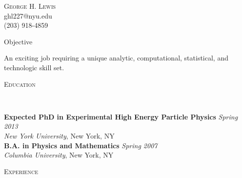 \documentclass[9pt]{article}
\newenvironment{changemargin}[2]{%
  \begin{list}{}{%
    \setlength{\topsep}{0pt}%
    \setlength{\leftmargin}{#1}%
    \setlength{\rightmargin}{#2}%
    \setlength{\listparindent}{\parindent}%
    \setlength{\itemindent}{\parindent}%
    \setlength{\parsep}{\parskip}%
  }%
  \item[]}{\end{list}
}
\newcommand{\lineover}{
	\begin{changemargin}{-0.05in}{-0.05in}
		\vspace*{-8pt}
		\hrulefill \\
		\vspace*{-2pt}
	\end{changemargin}
}
\newcommand{\header}[1]{
	\begin{changemargin}{-0.5in}{-0.5in}
		\scshape{#1}\\
  	\lineover
	\end{changemargin}
}
\newcommand{\contact}[4]{
	\begin{changemargin}{-0.5in}{-0.5in}
		\begin{center}
			{\Large \scshape {#1}}\\ \smallskip
			{#2}\\ \smallskip 
			{#3}\\ \smallskip
			{#4}\smallskip
		\end{center}
	\end{changemargin}
}
\newenvironment{body} {
	\vspace*{-16pt}
	\begin{changemargin}{-0.25in}{-0.5in}
  }	
	{\end{changemargin}
}
\begin{document}
\contact{George H. Lewis}{ghl227@nyu.edu}{(203) 918-4859}


\header{Objective}
\begin{body}
	\vspace{14pt}
	An exciting job requiring a unique analytic, computational, statistical, and technologic skill set.
\end{body}

\smallskip


\header{Education}

\begin{body}
	\vspace{14pt}
	\textbf{Expected PhD in Experimental High Energy Particle Physics }{} \hfill \emph{Spring 2013}{} \\
	\emph{New York University}, New York, NY{} \\
  \medskip
	\textbf{B.A. in Physics and Mathematics} \hfill \emph{Spring 2007} \\
	\emph{Columbia University}, New York, NY\\
\end{body}

\smallskip


\header{Experience}
\end{document}
